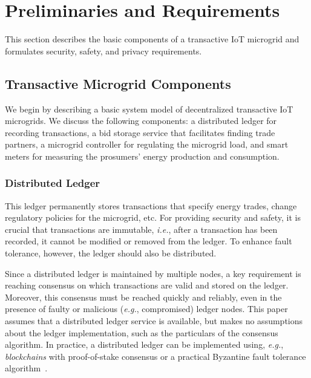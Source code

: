 \section{Preliminaries and Requirements}
This section describes the basic components of a transactive IoT
microgrid and formulates security, safety, and privacy requirements.

\subsection{Transactive Microgrid Components}

We begin by describing a basic system model of decentralized 
transactive IoT microgrids.  We discuss the following components: a
distributed ledger for recording transactions, a bid storage service
that facilitates finding trade partners, a microgrid controller for
regulating the microgrid load, and smart meters for measuring the
prosumers' energy production and consumption.

\subsubsection{Distributed Ledger}
This ledger permanently stores transactions that specify energy
trades, change regulatory policies for the microgrid, etc.  For
providing security and safety, it is crucial that transactions are
immutable, \emph{i.e.}, after a transaction has been recorded, it
cannot be modified or removed from the ledger.  To enhance fault
tolerance, however, the ledger should also be distributed.

Since a distributed ledger is maintained by multiple nodes, a key
requirement is reaching consensus on which transactions are valid and
stored on the ledger.  Moreover, this consensus must be reached
quickly and reliably, even in the presence of faulty or malicious
(\emph{e.g.}, compromised) ledger nodes.  This paper assumes that a
distributed ledger service is available, but makes no assumptions
about the ledger implementation, such as the particulars of the
consensus algorithm.  In practice, a distributed ledger can be
implemented using, \emph{e.g.}, \emph{blockchains} with proof-of-stake
consensus or a practical Byzantine fault tolerance
algorithm~\cite{castro1999practical}.

